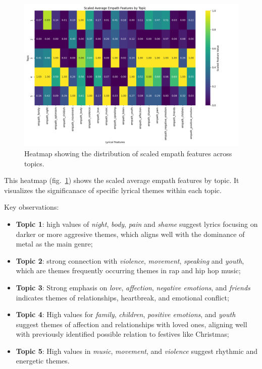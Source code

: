\begin{center}
\begin{figure}[H]
  \centering
  \includegraphics[width=6in]{img/lda_empath_features.png}
  \caption{Heatmap showing the distribution of scaled empath features across topics.}
  \label{Figure:lda_empath_features}
\end{figure}
\end{center}


This heatmap (fig.~\ref{Figure:lda_empath_features}) shows the scaled average
empath features by topic. It visualizes the significanace of specific lyrical
themes within each topic. 

\noindent \noindent Key observations:

\begin{itemize}
  \item \textbf{Topic 1}: high values of \textit{night}, \textit{body},
    \textit{pain} and \textit{shame} suggest lyrics focusing on darker or more
    aggresive themes, which aligns well with the dominance of metal as the main
    genre;
  \item \textbf{Topic 2}: strong connection with \textit{violence},
    \textit{movement}, \textit{speaking} and \textit{youth}, which are themes
    frequently occurring themes in rap and hip hop music;
  \item \textbf{Topic 3}: Strong emphasis on \textit{love}, \textit{affection},
    \textit{negative emotions}, and \textit{friends} indicates themes of
    relationships, heartbreak, and emotional conflict;
  \item \textbf{Topic 4}: High values for \textit{family}, \textit{children},
    \textit{positive emotions}, and \textit{youth} suggest themes of affection
    and relationships with loved ones, aligning well with previously identified
    possible relation to festives like Christmas;
  \item \textbf{Topic 5}: High values in \textit{music}, \textit{movement}, and
    \textit{violence} suggest rhythmic and energetic themes.
\end{itemize}

